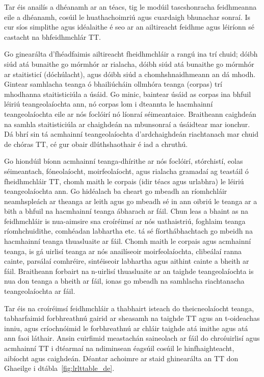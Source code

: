 \begin{multicols}{2}
Tar éis anailís a dhéanamh ar an téacs, tig le modúil tascshonracha feidhmeanna eile a dhéanamh, cosúil le huathachoimriú agus cuardaigh bhunachar sonraí. Is cur síos simplithe agus idéalaithe é seo ar an ailtireacht feidhme agus léiríonn sé castacht na bhfeidhmchlár TT.  

Go ginearálta d’fhéadfaimis ailtireacht fheidhmchláir a rangú ina trí chuid; dóibh siúd atá bunaithe go mórmhór ar rialacha, dóibh siúd atá bunaithe go mórmhór ar staitisticí (dóchúlacht), agus dóibh siúd a chomhshnaidhmeann an dá mhodh. Gintear  samhlacha teanga ó bhailiúcháin ollmhóra teanga (corpas) trí mhodhanna staitisticiúla a úsáid. Go minic, baintear úsáid as corpas ina bhfuil léiriú teangeolaíochta ann, nó corpas lom i dteannta le hacmhainní teangeolaíochta eile ar nós foclóirí nó líonraí séimeantaice. Braitheann caighdeán na samhla staitisticiúla ar chaighdeán na mbunsonraí a úsáidtear mar ionchur. Dá bhrí sin tá acmhainní teangeolaíochta d’ardchaighdeán riachtanach mar chuid de chóras TT, cé gur obair dlúthshaothair é iad a chruthú.

Go hiondúil bíonn acmhainní teanga-dhírithe ar nós foclóirí, stórchistí, eolas séimeantach, fóneolaíocht, moirfeolaíocht, agus rialacha gramadaí ag teastáil ó fheidhmchláir TT, chomh maith le corpais (idir téacs agus urlabhra) le léiriú teangeolaíochta ann. Go hidéalach ba cheart go mbeadh an ríomhchláir neamhspleách ar theanga ar leith agus go mbeadh sé in ann oibriú le teanga ar a bith a bhfuil na hacmhainní teanga ábharach ar fáil. Chun leas a bhaint as na feidhmchláir is nua-aimsire sna croíréimsí ar nós uathaistriú, foghlaim teanga ríomhchuidithe, comhéadan  labhartha etc. tá sé fíorthábhachtach go mbeidh na hacmhainní teanga thuasluaite ar fáil. Chomh maith le corpais agus acmhainní teanga, is gá uirlisí teanga ar nós anailíseoir moirfeolaíochta, clibeálaí ranna cainte, parsálaí comhréire, sintéiseoir labhartha agus aithint cainte a bheith ar fáil. Braitheann forbairt na n-uirlisí thuasluaite ar an taighde teangeolaíochta is nua don teanga a bheith ar fáil, ionas go mbeadh na samhlacha riachtanacha  teangeolaíochta  ar fáil.

Tar éis na croíréimsí feidhmchláir a thabhairt isteach do theicneolaíocht teanga, tabharfaimid forbhreathnú gairid ar sheasamh na taighde TT agus an t-oideachas inniu, agus críochnóimid le forbhreathnú ar chláir taighde atá imithe agus atá ann faoi láthair. Ansin cuirfimid meastachán saineolach ar fáil do chroíuirlisí agus acmhainní TT i dtéarmaí na ndiminsean éagsúil cosúil le hinfhaighteacht, aibíocht agus caighdeán. Déantar achoimre ar staid ghinearálta an TT don Ghaeilge i dtábla~\ref{fig:lrlttable_de}.



\end{multicols}
